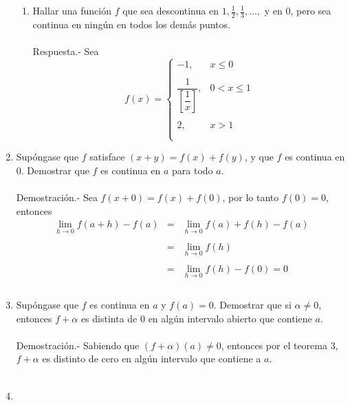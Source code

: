 \begin{enumerate}
\begin{enumerate}[\bfseries (a)]
    \item Hallar una función $f$ que sea descontinua en $1,\frac{1}{2},\frac{1}{3},\ldots,$ y en $0$, pero sea continua en ningún en todos los demás puntos.\\\\
	Respuesta.-\; Sea 
	$$f(x) = \left\{\begin{array}{rl}
	-1,&x\leq 0\\\\
	\dfrac{1}{\left[\dfrac{1}{x}\right]},&0<x\leq 1\\\\
	  2,&x>1\\\\
	\end{array}\right.$$

\end{enumerate}

\item Supóngase que  $f$ satisface $(x+y) = f(x)+f(y)$, y que $f$ es continua en $0$. Demostrar que $f$ es continua en $a$ para todo $a$.\\\\
    Demostración.-\; Sea $f(x+0) = f(x)+f(0)$, por lo tanto $f(0)=0$, entonces
    $$\begin{array}{rcl}
	\lim\limits_{h\to 0} f(a+h) - f(a)&=&\lim\limits_{h\to 0}f(a)+f(h)-f(a)\\\\
	&=&\lim\limits_{h\to 0}f(h)\\\\
	&=&\lim\limits_{h\to 0} f(h)-f(0) = 0\\\\
    \end{array}$$

\item Supóngase que $f$ es continua en $a$ y $f(a)=0$. Demostrar que si $\alpha \neq 0$, entonces $f+\alpha$ es distinta de $0$ en algún intervalo abierto que contiene $a$.\\\\
    Demostración.-\; Sabiendo que $(f+\alpha)(a)\neq 0$, entonces por el teorema 3, $f+\alpha$ es distinto de cero en algún intervalo que contiene a $a$.\\\\

\item 
\begin{enumerate}[\bfseries (a)]


\end{enumerate}
\end{enumerate}
